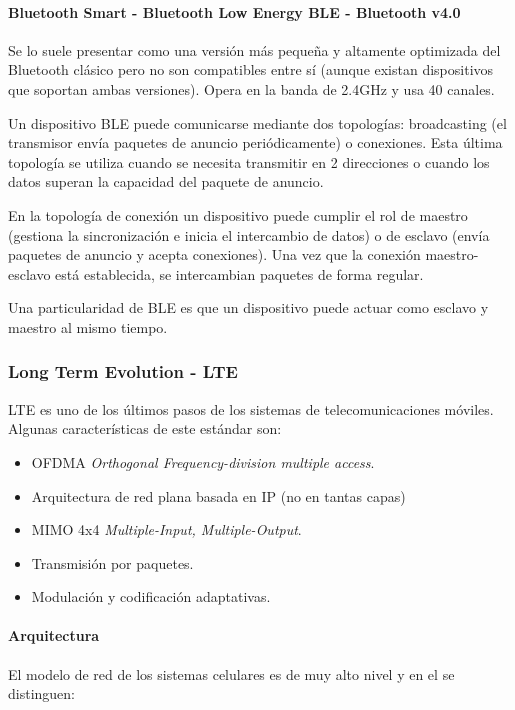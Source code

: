 \documentclass{book}
\begin{document}
	\paragraph{Bluetooth Smart - Bluetooth Low Energy BLE - Bluetooth v4.0}
	Se lo suele presentar como una versión más pequeña y altamente optimizada del Bluetooth clásico pero no son compatibles entre sí (aunque existan dispositivos que soportan ambas versiones). Opera en la banda de 2.4GHz y usa 40 canales.
	
	\vspace{3mm}
	Un dispositivo BLE puede comunicarse mediante dos topologías: broadcasting (el transmisor envía paquetes de anuncio periódicamente) o conexiones. Esta última topología se utiliza cuando se necesita transmitir en 2 direcciones o cuando los datos superan la capacidad del paquete de anuncio.
	
	\vspace{3mm}
	En la topología de conexión un dispositivo puede cumplir el rol de maestro (gestiona la sincronización e inicia el intercambio de datos) o de esclavo (envía paquetes de anuncio y acepta conexiones). Una vez que la conexión maestro-esclavo está establecida, se intercambian paquetes de forma regular.
	
	\vspace{3mm}
	Una particularidad de BLE es que un dispositivo puede actuar como esclavo y maestro al mismo tiempo.
	
	\subsubsection{Long Term Evolution - LTE}
	LTE es uno de los últimos pasos de los sistemas de telecomunicaciones móviles. Algunas características de este estándar son:
	
	\begin{itemize}
		\item OFDMA \textit{Orthogonal Frequency-division multiple access}.
		\item Arquitectura de red plana basada en IP (no en tantas capas)
		\item MIMO 4x4 \textit{Multiple-Input, Multiple-Output}.
		\item Transmisión por paquetes.
		\item Modulación y codificación adaptativas.
	\end{itemize}
	
	\paragraph{Arquitectura}
	El modelo de red de los sistemas celulares es de muy alto nivel y en el se distinguen:
	
\end{document}
